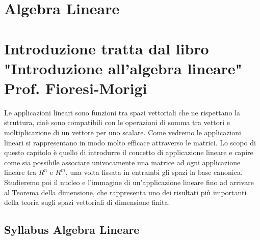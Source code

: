 \section{Algebra Lineare}



\section{Introduzione tratta dal libro "Introduzione all'algebra lineare" Prof. Fioresi-Morigi}
Le applicazioni lineari sono funzioni tra spazi vettoriali che ne rispettano la struttura, cioè sono compatibili con le operazioni di somma tra vettori e moltiplicazione di un
vettore per uno scalare. Come vedremo le applicazioni lineari si rappresentano in modo molto efficace attraverso le matrici. Lo scopo di questo capitolo è quello di introdurre
il concetto di applicazione lineare e capire come sia possibile associare univocamente una matrice ad ogni applicazione lineare tra $R^n$ e $R^m$, una volta fissata in entrambi
gli spazi la base canonica. Studieremo poi il nucleo e l'immagine di un'applicazione lineare fino ad arrivare al Teorema della dimensione, che rappresenta uno dei risultati più
importanti della teoria sugli spazi vettoriali di dimensione finita.




\subsection*{Syllabus Algebra Lineare}
